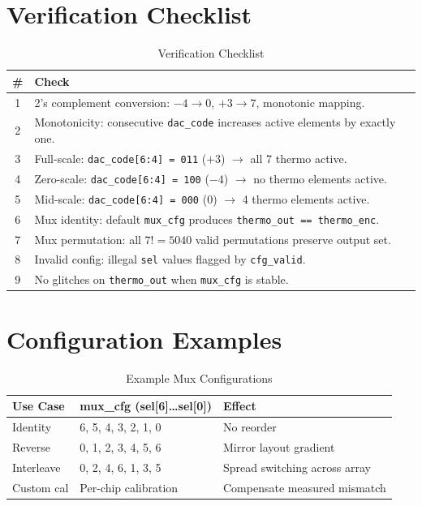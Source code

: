 \documentclass[11pt,a4paper]{article}
\begin{document}
\section{Verification Checklist}

\begin{table}[h]
\centering
\begin{tabular}{@{}cl@{}}
\toprule
\textbf{\#} & \textbf{Check} \\
\midrule
1 & 2's complement conversion: $-4 \rightarrow 0$, $+3 \rightarrow 7$, monotonic mapping. \\
2 & Monotonicity: consecutive \texttt{dac\_code} increases active elements by exactly one. \\
3 & Full-scale: \texttt{dac\_code[6:4] = 011} ($+3$) $\rightarrow$ all 7 thermo active. \\
4 & Zero-scale: \texttt{dac\_code[6:4] = 100} ($-4$) $\rightarrow$ no thermo elements active. \\
5 & Mid-scale: \texttt{dac\_code[6:4] = 000} ($0$) $\rightarrow$ 4 thermo elements active. \\
6 & Mux identity: default \texttt{mux\_cfg} produces \texttt{thermo\_out == thermo\_enc}. \\
7 & Mux permutation: all $7! = 5040$ valid permutations preserve output set. \\
8 & Invalid config: illegal \texttt{sel} values flagged by \texttt{cfg\_valid}. \\
9 & No glitches on \texttt{thermo\_out} when \texttt{mux\_cfg} is stable. \\
\bottomrule
\end{tabular}
\caption{Verification Checklist}
\end{table}

\section{Configuration Examples}

\begin{table}[h]
\centering
\begin{tabular}{@{}llp{6cm}@{}}
\toprule
\textbf{Use Case} & \textbf{mux\_cfg (sel[6]\ldots sel[0])} & \textbf{Effect} \\
\midrule
Identity    & 6, 5, 4, 3, 2, 1, 0 & No reorder \\
Reverse     & 0, 1, 2, 3, 4, 5, 6 & Mirror layout gradient \\
Interleave  & 0, 2, 4, 6, 1, 3, 5 & Spread switching across array \\
Custom cal  & Per-chip calibration  & Compensate measured mismatch \\
\bottomrule
\end{tabular}
\caption{Example Mux Configurations}
\end{table}
\end{document}
